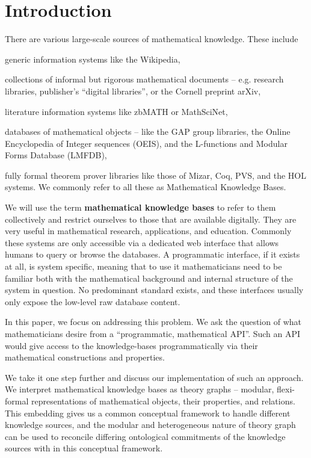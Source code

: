 \section{Introduction}\label{sec:intro}

There are various large-scale sources of mathematical knowledge.  These include
\begin{compactitem}
\item generic information systems like the Wikipedia,
\item collections of informal but rigorous mathematical documents -- e.g. research libraries, publisher's ``digital libraries'', or the Cornell preprint arXiv,
\item literature information systems like zbMATH or MathSciNet,
\item databases of mathematical objects -- like the GAP group libraries, the Online Encyclopedia of Integer sequences (OEIS), and the L-functions and Modular Forms Database (LMFDB),
\item fully formal theorem prover libraries like those of Mizar, Coq, PVS, and the HOL systems.  We commonly refer to all these as Mathematical Knowledge Bases.
\end{compactitem}
  
We will use the term \textbf{mathematical knowledge bases} to refer to them collectively and restrict ourselves to those that are available digitally. They are very useful in mathematical research, applications, and education.  Commonly these systems are only accessible via a dedicated web interface that allows humans to query or browse the databases.  A programmatic interface, if it exists at all, is system specific, meaning that to use it mathematicians need to be familiar both with the mathematical background and internal structure of the system in question.  No predominant standard exists, and these interfaces usually only expose the low-level raw database content.

In this paper, we focus on addressing this problem. 
We ask the question of what mathematicians desire from a ``programmatic, mathematical API''. 
Such an API would give access to the knowledge-bases programmatically via their mathematical constructions and properties. 

We take it one step further and discuss our implementation of such an approach.  We interpret mathematical knowledge bases as \ommt theory graphs -- modular, flexi-formal representations of mathematical objects, their properties, and relations. This embedding gives us a common conceptual framework to handle different knowledge sources, and the modular and heterogeneous nature of \ommt theory graph can be used to reconcile differing ontological commitments of the knowledge sources with in this conceptual framework.

